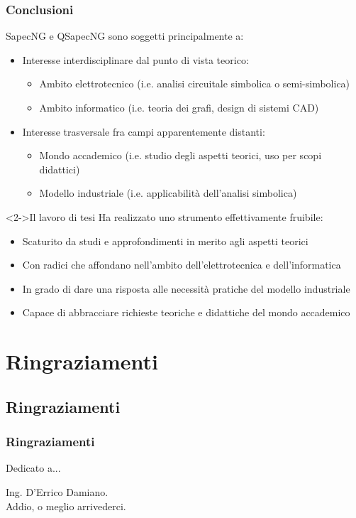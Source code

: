 \begin{frame}
 \frametitle{Conclusioni}

 SapecNG e QSapecNG sono soggetti principalmente a:
 \begin{itemize}
  \item Interesse interdisciplinare dal punto di vista teorico:
    \begin{itemize}
     \item Ambito elettrotecnico (i.e. analisi circuitale simbolica o semi-simbolica)
     \item Ambito informatico (i.e. teoria dei grafi, design di sistemi CAD)
    \end{itemize}
  \item Interesse trasversale fra campi apparentemente distanti:
    \begin{itemize}
     \item Mondo accademico (i.e. studio degli aspetti teorici, uso per scopi didattici)
     \item Modello industriale (i.e. applicabilità dell'analisi simbolica)
    \end{itemize}
 \end{itemize}

 \bigskip

 \begin{block}<2->{Il lavoro di tesi}
  Ha realizzato uno strumento effettivamente fruibile:
  \begin{itemize}
   \item Scaturito da studi e approfondimenti in merito agli aspetti teorici
   \item Con radici che affondano nell'ambito dell'elettrotecnica e dell'informatica
   \item In grado di dare una risposta alle necessità pratiche del modello industriale
   \item Capace di abbracciare richieste teoriche e didattiche del mondo accademico
  \end{itemize}
 \end{block}

\end{frame}


\section{Ringraziamenti}

\subsection{Ringraziamenti}


\begin{frame}
 \frametitle{Ringraziamenti}

 \begin{block}{Dedicato a...}
  \bigskip
  \begin{center}
    \Large
    Ing. D'Errico Damiano.\\
    \medskip
    \normalsize
    Addio, o meglio arrivederci.\\
  \end{center}
  \bigskip
 \end{block}

\end{frame}
